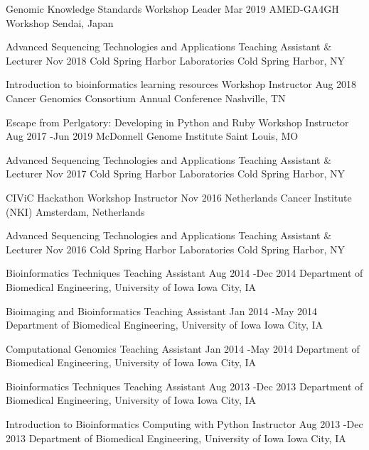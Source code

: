 \documentclass[10pt]{article} %
\begin{document}
\instruction
{Genomic Knowledge Standards}
{Workshop Leader}
{Mar 2019}{}
{AMED-GA4GH Workshop}
{Sendai, Japan}

\instruction
{Advanced Sequencing Technologies and Applications}
{Teaching Assistant \& Lecturer}
{Nov 2018}{}
{Cold Spring Harbor Laboratories}
{Cold Spring Harbor, NY}

\instruction
{Introduction to bioinformatics learning resources}
{Workshop Instructor}
{Aug 2018}{}
{Cancer Genomics Consortium Annual Conference}
{Nashville, TN}

\instruction
{Escape from Perlgatory: Developing in Python and Ruby}
{Workshop Instructor}
{Aug 2017 -}{Jun 2019}
{McDonnell Genome Institute}
{Saint Louis, MO}

\instruction
{Advanced Sequencing Technologies and Applications}
{Teaching Assistant \& Lecturer}
{Nov 2017}{}
{Cold Spring Harbor Laboratories}
{Cold Spring Harbor, NY}

\instruction
{CIViC Hackathon}
{Workshop Instructor}
{Nov 2016}{}
{Netherlands Cancer Institute (NKI)}
{Amsterdam, Netherlands}

\instruction
{Advanced Sequencing Technologies and Applications}
{Teaching Assistant \& Lecturer}
{Nov 2016}{}
{Cold Spring Harbor Laboratories}
{Cold Spring Harbor, NY}

\instruction
{Bioinformatics Techniques}
{Teaching Assistant}
{Aug 2014 -}{Dec 2014}
{Department of Biomedical Engineering, University of Iowa}
{Iowa City, IA}

\instruction
{Bioimaging and Bioinformatics}
{Teaching Assistant}
{Jan 2014 -}{May 2014}
{Department of Biomedical Engineering, University of Iowa}
{Iowa City, IA}

\instruction
{Computational Genomics}
{Teaching Assistant}
{Jan 2014 -}{May 2014}
{Department of Biomedical Engineering, University of Iowa}
{Iowa City, IA}

\instruction
{Bioinformatics Techniques}
{Teaching Assistant}
{Aug 2013 -}{Dec 2013}
{Department of Biomedical Engineering, University of Iowa}
{Iowa City, IA}

\instruction
{Introduction to Bioinformatics Computing with Python}
{Instructor}
{Aug 2013 -}{Dec 2013}
{Department of Biomedical Engineering, University of Iowa}
{Iowa City, IA}

\end{document}
